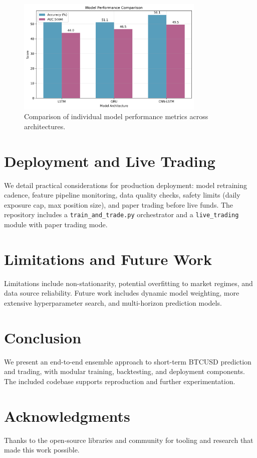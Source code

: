 \documentclass[11pt,a4paper]{article}
\begin{document}
\begin{figure}[ht]
    \centering
    \includegraphics[width=0.8\textwidth]{figures/model_comparison.png}
    \caption{Comparison of individual model performance metrics across architectures.}
    \label{fig:model_comparison}
\end{figure}

\section{Deployment and Live Trading}
We detail practical considerations for production deployment: model retraining cadence, feature pipeline monitoring, data quality checks, safety limits (daily exposure cap, max position size), and paper trading before live funds. The repository includes a \texttt{train\_and\_trade.py} orchestrator and a \texttt{live\_trading} module with paper trading mode.

\section{Limitations and Future Work}
Limitations include non-stationarity, potential overfitting to market regimes, and data source reliability. Future work includes dynamic model weighting, more extensive hyperparameter search, and multi-horizon prediction models.

\section{Conclusion}
We present an end-to-end ensemble approach to short-term BTCUSD prediction and trading, with modular training, backtesting, and deployment components. The included codebase supports reproduction and further experimentation.

\section*{Acknowledgments}
Thanks to the open-source libraries and community for tooling and research that made this work possible.



\end{document}
